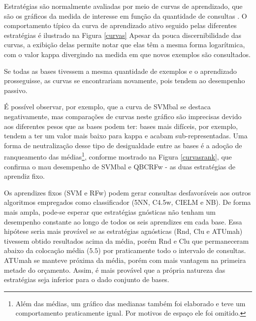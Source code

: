 Estratégias são normalmente avaliadas por meio de curvas de aprendizado,
que são os gráficos da medida de interesse em função da quantidade de consultas
\citep{settles2010active}.
O comportamento típico da curva de aprendizado ativo seguido pelas diferentes estratégias
é ilustrado na Figura \ref{curvas}
Apesar da pouca discernibilidade das curvas, a exibição delas permite notar
que elas têm a mesma forma logarítmica, com o valor kappa divergindo na medida em que novos
exemplos são consultados.

Se todas as bases tivessem a mesma quantidade de exemplos
e o aprendizado prosseguisse, as curvas se encontrariam novamente,
pois tendem ao desempenho passivo.

É possível observar, por exemplo,
que a curva de SVMbal se destaca negativamente,
mas comparações de curvas neste gráfico são imprecisas devido aos diferentes
pesos que as bases podem ter:
bases mais difíceis, por exemplo, tendem a ter um valor mais baixo para kappa e acabam
sub-representadas.
Uma forma de neutralização desse tipo de desigualdade entre as bases é a adoção
de ranqueamento das médias\footnote{Além das médias,
um gráfico das medianas também foi elaborado e teve um comportamento praticamente igual.
Por motivos de espaço ele foi omitido.}, conforme mostrado na Figura \ref{curvasrank},
que confirma o mau desempenho de SVMbal e QBCRFw - as duas estratégias de aprendiz fixo.

Os aprendizes fixos (SVM e RFw) podem gerar consultas desfavoráveis aos outros algoritmos
empregados como classificador (5NN, C4.5w, CIELM e NB).
De forma mais ampla, pode-se esperar que estratégias gnósticas não tenham um desempenho
constante ao longo de todos os seis aprendizes em cada base.
Essa hipótese seria mais provável se as estratégias agnósticas (Rnd, Clu e ATUmah) tivessem obtido
resultados acima da média, porém Rnd e Clu que permaneceram
abaixo da colocação média ($5.5$) por praticamente todo o intervalo de consultas.
ATUmah se manteve próxima da média, porém com mais vantagem na primeira metade do orçamento.
Assim, é mais provável que a própria natureza das estratégias seja inferior para o dado conjunto de bases.

